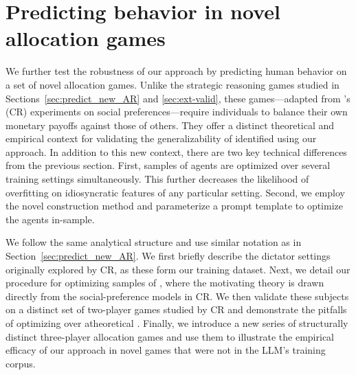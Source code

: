 \section{Predicting behavior in novel allocation games}
\label{app:predict_new_CR}

We further test the robustness of our approach by predicting human behavior on a set of novel allocation games.
Unlike the strategic reasoning games studied in Sections~\ref{sec:predict_new_AR} and \ref{sec:ext-valid}, these games---adapted from \cite{charness2002understanding}'s (CR) experiments on social preferences---require individuals to balance their own monetary payoffs against those of others. 
They offer a distinct theoretical and empirical context for validating the generalizability of  identified using our approach.
In addition to this new context, there are two key technical differences from the previous section.
First, samples of agents are optimized over several training settings simultaneously.
This further decreases the likelihood of overfitting on idiosyncratic features of any particular setting.
Second, we employ the novel construction method and parameterize a prompt template to optimize the agents in-sample.

We follow the same analytical structure and use similar notation as in Section~\ref{sec:predict_new_AR}.
We first briefly describe the dictator settings originally explored by CR, as these form our training dataset. 
Next, we detail our procedure for optimizing samples of , where the motivating theory is drawn directly from the social-preference models in CR. 
We then validate these subjects on a distinct set of two-player games studied by CR and demonstrate the pitfalls of optimizing over atheoretical .
Finally, we introduce a new series of structurally distinct three-player allocation games and use them to illustrate the empirical efficacy of our approach in novel games that were not in the LLM's training corpus.

